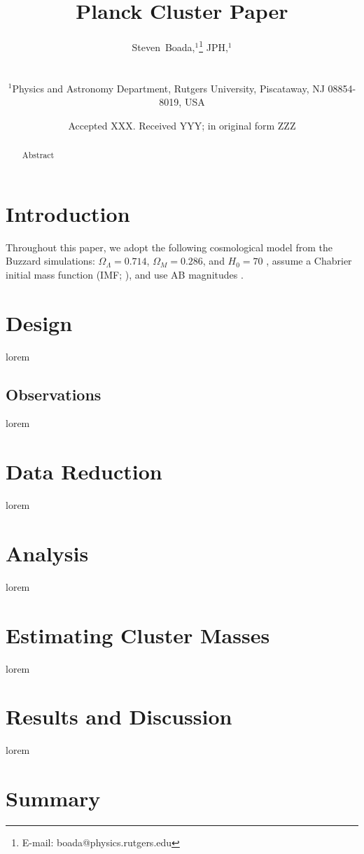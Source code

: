 \documentclass[fleqn,usenatbib]{mnras}
\title[Planck Cluster Paper]{Planck Cluster Paper}
\author[S. Boada et al.]
{\parbox{\textwidth}{Steven~Boada,$^{1}$\thanks{E-mail: boada@physics.rutgers.edu}
JPH,$^{1}$
}\vspace{0.4cm}\
\\
\parbox{\textwidth}{$^{1}$Physics and Astronomy Department, Rutgers University, Piscataway, NJ 08854-8019, USA}}
\date{Accepted XXX. Received YYY; in original form ZZZ}
\begin{document}
 
\label{firstpage} 
\pagerange{
\pageref{firstpage}-- 
\pageref{lastpage}} 
\maketitle 

\begin{abstract}
	\noindent Abstract
\end{abstract}

\section{Introduction} 
Throughout this paper, we adopt the following cosmological model from the Buzzard simulations: $\Omega_\Lambda = 0.714$, $\Omega_M = 0.286$, and $H_0= 70$ \kms \mpc, assume a Chabrier initial mass function (IMF; \citealt{Chabrier2003}), and use AB magnitudes \citep{Oke1974}.

\section{Design}\label{sec:design} 
lorem 
\subsection{Observations}\label{sec: observations} 
lorem

\section{Data Reduction}\label{sec:data reduction} 
lorem

\section{Analysis}\label{sec:analysis} 
lorem

\section{Estimating Cluster Masses}
lorem

\section{Results and Discussion}\label{sec:results}

lorem

\section{Summary}\label{sec:summary}
\end{document}
